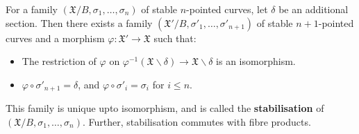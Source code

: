 \begin{proposition}
    For a family $(\mathfrak{X}/B, \sigma_{1},\dots,\sigma_{n})$ of stable $n$-pointed curves, let $\delta$ be an additional section.
    Then there exists a family $(\mathfrak{X}'/B, \sigma'_{1},\dots,\sigma'_{n+1})$ of stable $n+1$-pointed curves and a morphism $\varphi: \mathfrak{X}'\to \mathfrak{X}$ such that:
    \begin{itemize}
        \item The restriction of $\varphi$ on $\varphi^{-1}(\mathfrak{X}\backslash \delta) \to \mathfrak{X}\backslash \delta$ is an isomorphism.
        \item $\varphi \circ \sigma'_{n+1} = \delta$, and $\varphi \circ \sigma'_{i} = \sigma_{i}$ for $i \leq n$.
    \end{itemize}
    This family is unique upto isomorphism, and is called the \textbf{stabilisation} of $(\mathfrak{X}/B, \sigma_{1}, \dots, \sigma_{n})$. Further, stabilisation commutes with fibre products.
\end{proposition}

